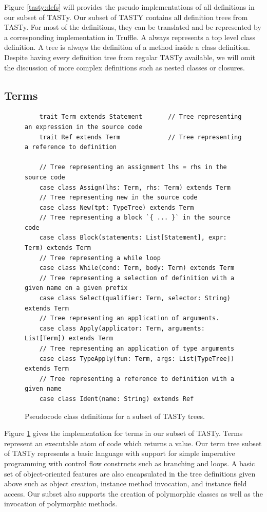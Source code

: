 Figure \ref{tasty:defs} will provides the pseudo implementations of all definitions in our subset of TASTy.
Our subset of TASTY contains all definition trees from TASTy.
For most of the definitions, they can be translated and be represented by a corresponding implementation in Truffle.
A  always represents a top level class definition.
A  tree is always the definition of a method inside a class definition.
Despite having every definition tree from regular TASTy available, we will omit the discussion of more complex definitions such as nested classes or closures.

\subsection{Terms}
\begin{figure}[!htb]
	\begin{verbatim}
	trait Term extends Statement       // Tree representing an expression in the source code
	trait Ref extends Term             // Tree representing a reference to definition
	
	// Tree representing an assignment lhs = rhs in the source code
	case class Assign(lhs: Term, rhs: Term) extends Term
	// Tree representing new in the source code
	case class New(tpt: TypeTree) extends Term
	// Tree representing a block `{ ... }` in the source code
	case class Block(statements: List[Statement], expr: Term) extends Term
	// Tree representing a while loop
	case class While(cond: Term, body: Term) extends Term
	// Tree representing a selection of definition with a given name on a given prefix
	case class Select(qualifier: Term, selector: String) extends Term 
	// Tree representing an application of arguments.
	case class Apply(applicator: Term, arguments: List[Term]) extends Term
	// Tree representing an application of type arguments
	case class TypeApply(fun: Term, args: List[TypeTree]) extends Term
	// Tree representing a reference to definition with a given name
	case class Ident(name: String) extends Ref 
	\end{verbatim} 
	\caption{Pseudocode class definitions for a subset of TASTy trees.}
	\label{tasty:terms}
\end{figure}

Figure \ref{tasty:terms} gives the implementation for terms in our subset of TASTy.
Terms represent an executable atom of code which returns a value.
Our term tree subset of TASTy represents a basic language with support for simple imperative programming with control flow constructs such as branching and loops.
A basic set of object-oriented features are also encapsulated in the tree definitions given above such as object creation, instance method invocation, and instance field access.
Our subset also supports the creation of polymorphic classes as well as the invocation of polymorphic methods.

